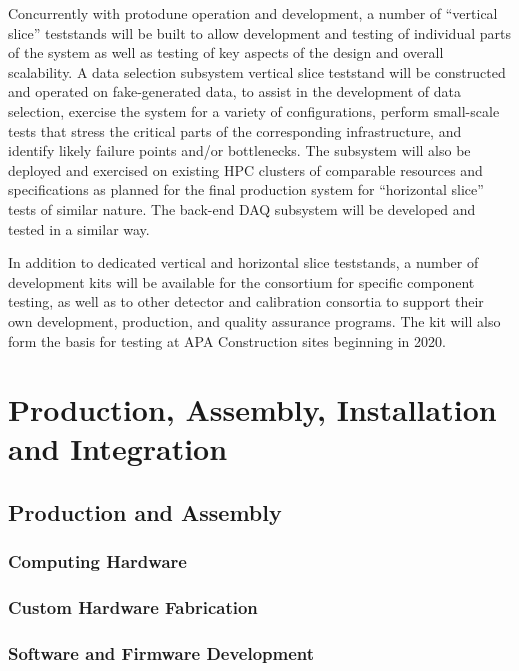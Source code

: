 Concurrently with protodune operation and development, a number of
``vertical slice'' teststands will be built to allow 
development and testing of individual parts of the  system
as well as testing of key aspects of the design and overall
scalability. A data selection subsystem vertical slice teststand will be
constructed and operated on fake-generated data, to assist in the
development of data selection, exercise the system for a variety of
configurations, perform small-scale tests that stress the critical
parts of the corresponding infrastructure, 
and identify likely failure points and/or bottlenecks. The subsystem
will also be deployed and exercised on existing HPC clusters of
comparable resources and specifications as planned for the final
production system for ``horizontal slice'' tests of similar nature. The
back-end DAQ subsystem will be developed and tested in a similar way.

In addition to dedicated vertical and horizontal slice teststands, a number of
 development kits will be available for the consortium for
specific component testing, as well as to other detector and
calibration consortia to support their own development, production, and quality assurance programs. The  
kit will also form the basis for testing at APA Construction sites beginning in 2020. 

\section{Production, Assembly, Installation and Integration}
\label{sec:daq:production}


\subsection{Production and Assembly}

\subsubsection{Computing Hardware}

\subsubsection{Custom Hardware Fabrication}

\subsubsection{Software and Firmware Development}

